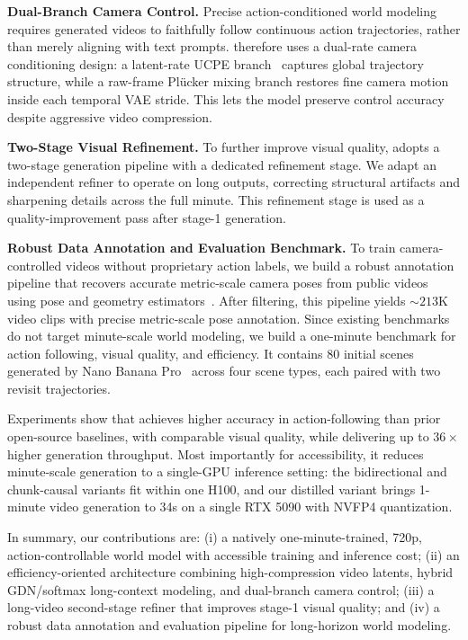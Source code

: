 \noindent\textbf{Dual-Branch Camera Control.}
Precise action-conditioned world modeling requires generated videos to faithfully follow continuous action trajectories, rather than merely aligning with text prompts.
\modelname therefore uses a dual-rate camera conditioning design: a latent-rate UCPE branch~\citep{ucpe} captures global trajectory structure, while a raw-frame Pl\"ucker mixing branch restores fine camera motion inside each temporal VAE stride.
This lets the model preserve control accuracy despite aggressive video compression.

\noindent\textbf{Two-Stage Visual Refinement.}
To further improve visual quality, \modelname adopts a two-stage generation pipeline with a dedicated refinement stage.
We adapt an independent refiner
to operate on long \modelname outputs, correcting structural artifacts and sharpening details across the full minute.
This refinement stage is used as a quality-improvement pass after stage-1 generation.

\noindent\textbf{Robust Data Annotation and Evaluation Benchmark.}
To train camera-controlled videos without proprietary action labels, we build a robust annotation pipeline that recovers accurate metric-scale camera poses from public videos using pose and geometry estimators~\citep{vipe,pi3x,moge2}.
After filtering, this pipeline yields ${\sim}213$K video clips with precise metric-scale pose annotation.
Since existing benchmarks do not target minute-scale world modeling, we build a one-minute benchmark for action following, visual quality, and efficiency.
It contains 80 initial scenes generated by Nano Banana Pro~\citep{google2025nanobananapro} across four scene types, each paired with two revisit trajectories.

\noindent Experiments show that \modelname achieves higher accuracy in action-following than prior open-source baselines, with comparable visual quality, while delivering up to $36\times$ higher generation throughput.
Most importantly for accessibility, it reduces minute-scale generation to a single-GPU inference setting: the bidirectional and chunk-causal variants fit within one H100, and our distilled variant brings 1-minute video generation to 34s on a single RTX 5090 with NVFP4 quantization.

\noindent In summary, our contributions are: (i) a natively one-minute-trained, 720p, action-controllable world model with accessible training and inference cost; (ii) an efficiency-oriented architecture combining high-compression video latents, hybrid GDN/softmax long-context modeling, and dual-branch camera control; (iii) a long-video second-stage refiner that improves stage-1 visual quality; and (iv) a robust data annotation and evaluation pipeline for long-horizon world modeling.
















